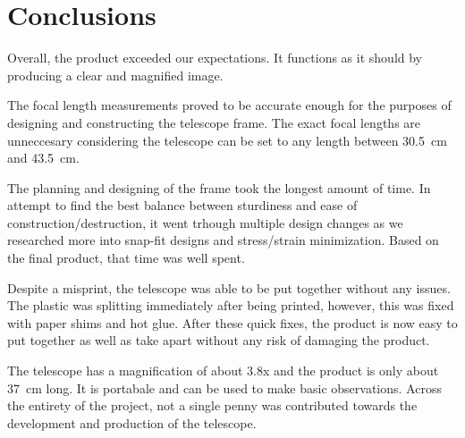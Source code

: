 \section{Conclusions}
\label{sec:Conclusions}
Overall, the product exceeded our expectations. It functions as it should by producing a clear and magnified image.

The focal length measurements proved to be accurate enough for the purposes of designing and constructing the telescope frame. The exact focal lengths are unneccesary considering the telescope can be set to any length between \SI{30.5}{\centi\meter} and \SI{43.5}{\centi\meter}. 

The planning and designing of the frame took the longest amount of time. In attempt to find the best balance between sturdiness and ease of construction/destruction, it went trhough multiple design changes as we researched more into snap-fit designs and stress/strain minimization. Based on the final product, that time was well spent.

Despite a misprint, the telescope was able to be put together without any issues. The plastic was splitting immediately after being printed, however, this was fixed with paper shims and hot glue. After these quick fixes, the product is now easy to put together as well as take apart without any risk of damaging the product.

The telescope has a magnification of about 3.8x and the product is only about \SI{37}{\centi\meter} long. It is portabale and can be used to make basic observations. Across the entirety of the project, not a single penny was contributed towards the development and production of the telescope.
